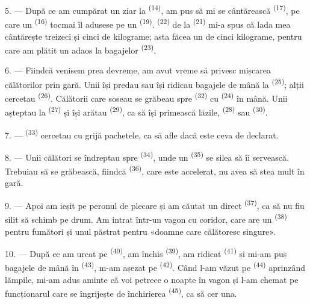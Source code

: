 \VUsaut{3.0mm}

5. --- După ce am cumpărat un ziar la  \textsuperscript{(14)}, am
pus să mi se cântărească  \textsuperscript{(17)}, pe care un
 \textsuperscript{(16)} tocmai îl adusese pe un  \textsuperscript{(19)}.  \textsuperscript{(22)} de la
 \textsuperscript{(21)} mi-a spus că lada mea cântărește treizeci și
cinci de kilograme; asta făcea un  de cinci kilograme, pentru care
am plătit un adaos la  bagajelor \textsuperscript{(23)}.

6. --- Fiindcă venisem prea devreme, am avut vreme să privesc mișcarea călătorilor
prin gară. Unii își predau sau își ridicau bagajele de mână la  \textsuperscript{(25)}; alții cercetau 
\textsuperscript{(26)}. Călătorii care soseau se grăbeau spre 
\textsuperscript{(32)} cu  \textsuperscript{(24)} în mână.
Unii așteptau la  \textsuperscript{(27)} și își arătau
 \textsuperscript{(29)}, ca să își primească lăzile,
 \textsuperscript{(28)} sau 
\textsuperscript{(30)}.

7. ---  \textsuperscript{(33)} cercetau cu grijă
pachetele, ca să afle dacă este ceva de declarat.

8. --- Unii călători se îndreptau spre  \textsuperscript{(34)}, unde
un  \textsuperscript{(35)} se silea să îi servească. Trebuiau să se
grăbească, fiindcă  \textsuperscript{(36)}, care este accelerat, nu
avea să stea mult în gară.

9. --- Apoi am ieșit pe peronul de plecare și am căutat un  direct
\textsuperscript{(37)}, ca să nu fiu silit să schimb pe drum. Am intrat într-un
vagon cu coridor, care are un  \textsuperscript{(38)} pentru
fumători și unul păstrat pentru «doamne care călătoresc singure».

\VUsaut{3.0mm}

10. --- După ce am urcat pe  \textsuperscript{(40)}, am închis
 \textsuperscript{(39)}, am ridicat 
\textsuperscript{(41)} și mi-am pus bagajele de mână în 
\textsuperscript{(43)}, m-am așezat pe  \textsuperscript{(42)}.
Când l-am văzut pe  \textsuperscript{(44)} aprinzând lămpile,
mi-am adus aminte că voi petrece o noapte în vagon și l-am chemat pe funcționarul
care se îngrijește de închirierea  \textsuperscript{(45)}, ca să
cer una.

